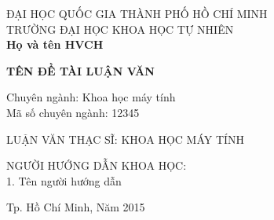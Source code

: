 \begin{titlepage}

\begin{center}
ĐẠI HỌC QUỐC GIA THÀNH PHỐ HỒ CHÍ MINH\\
TRƯỜNG ĐẠI HỌC KHOA HỌC TỰ NHIÊN\\[2cm]

{ \LARGE \bfseries Họ và tên HVCH\\[1cm] } 

{ \huge \bfseries TÊN ĐỀ TÀI LUẬN VĂN\\[2cm] } 

\begin{flushleft} \large
Chuyên ngành: Khoa học máy tính\\
Mã số chuyên ngành: 12345\\[2cm]
\end{flushleft}

\large LUẬN VĂN THẠC SĨ: KHOA HỌC MÁY TÍNH\\[2cm]


\begin{flushright} \large
NGƯỜI HƯỚNG DẪN KHOA HỌC:\\
1. Tên người hướng dẫn
\end{flushright}


\vfill
Tp. Hồ Chí Minh, Năm 2015

\end{center}

\end{titlepage}